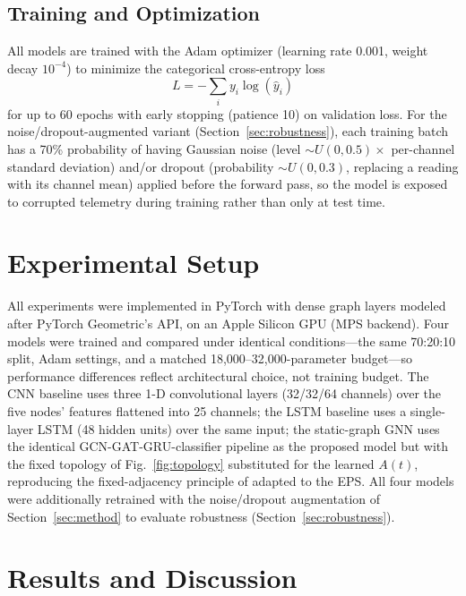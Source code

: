 \documentclass[conference]{IEEEtran}
\begin{document}
\subsection{Training and Optimization}

All models are trained with the Adam optimizer (learning rate 0.001, weight decay $10^{-4}$)
to minimize the categorical cross-entropy loss
\begin{equation}
L = -\sum_i y_i \log(\hat{y}_i)
\label{eq:loss}
\end{equation}
for up to 60 epochs with early stopping (patience 10) on validation loss. For the
noise/dropout-augmented variant (Section~\ref{sec:robustness}), each training batch has a 70\%
probability of having Gaussian noise (level $\sim U(0, 0.5)\times$ per-channel standard
deviation) and/or dropout (probability $\sim U(0, 0.3)$, replacing a reading with its channel
mean) applied before the forward pass, so the model is exposed to corrupted telemetry during
training rather than only at test time.

\section{Experimental Setup}
\label{sec:setup}

All experiments were implemented in PyTorch with dense graph layers modeled after PyTorch
Geometric's API, on an Apple Silicon GPU (MPS backend). Four models were trained and compared
under identical conditions---the same 70:20:10 split, Adam settings, and a matched
18{,}000--32{,}000-parameter budget---so performance differences reflect architectural choice,
not training budget. The CNN baseline uses three 1-D convolutional layers (32/32/64 channels)
over the five nodes' features flattened into 25 channels; the LSTM baseline uses a
single-layer LSTM (48 hidden units) over the same input; the static-graph GNN uses the
identical GCN-GAT-GRU-classifier pipeline as the proposed model but with the fixed topology of
Fig.~\ref{fig:topology} substituted for the learned $A(t)$, reproducing the fixed-adjacency
principle of \cite{b1,b6} adapted to the EPS. All four models were additionally retrained with
the noise/dropout augmentation of Section~\ref{sec:method} to evaluate robustness
(Section~\ref{sec:robustness}).

\section{Results and Discussion}
\label{sec:results}
\end{document}
